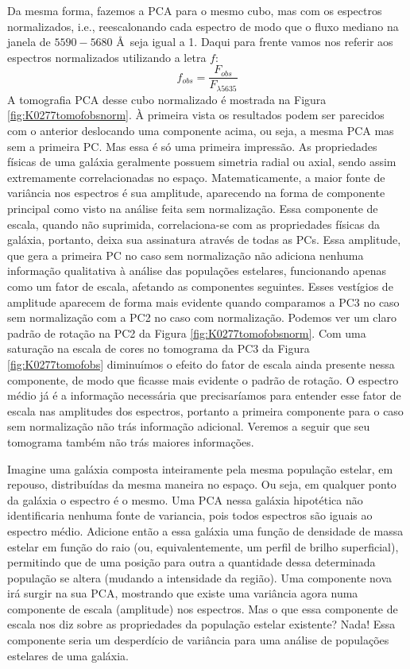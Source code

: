 Da mesma forma, fazemos a PCA para o mesmo cubo, mas com os espectros normalizados, i.e., reescalonando cada espectro de
modo que o fluxo mediano na janela de $5590-5680$ \AA\ seja igual a 1. Daqui para frente vamos nos referir aos espectros
normalizados utilizando a letra $f$:
\begin{equation}
f_{obs} = \dfrac{F_{obs}}{F_{\lambda5635}}
\end{equation} 
\noindent A tomografia PCA desse cubo normalizado é mostrada na Figura \ref{fig:K0277tomofobsnorm}. À primeira vista os
resultados podem ser parecidos com o anterior deslocando uma componente acima, ou seja, a mesma PCA mas sem a primeira
PC. Mas essa é só uma primeira impressão. As propriedades físicas de uma galáxia geralmente possuem simetria radial ou
axial, sendo assim extremamente correlacionadas no espaço. Matematicamente, a maior fonte de variância nos espectros é
sua amplitude, aparecendo na forma de componente principal como visto na análise feita sem normalização. Essa componente
de escala, quando não suprimida, correlaciona-se com as propriedades físicas da galáxia, portanto, deixa sua assinatura
através de todas as PCs. Essa amplitude, que gera a primeira PC no caso sem normalização não adiciona nenhuma informação
qualitativa à análise das populações estelares, funcionando apenas como um fator de escala, afetando as componentes
seguintes. Esses vestígios de amplitude aparecem de forma mais evidente quando comparamos a PC3 no caso sem normalização
com a PC2 no caso com normalização. Podemos ver um claro padrão de rotação na PC2 da Figura \ref{fig:K0277tomofobsnorm}.
Com uma saturação na escala de cores no tomograma da PC3 da Figura \ref{fig:K0277tomofobs} diminuímos o efeito do fator
de escala ainda presente nessa componente, de modo que ficasse mais evidente o padrão de rotação. O espectro médio já é
a informação necessária que precisaríamos para entender esse fator de escala nas amplitudes dos espectros, portanto a
primeira componente para o caso sem normalização não trás informação adicional. Veremos a seguir que seu tomograma
também não trás maiores informações.

Imagine uma galáxia composta inteiramente pela mesma população estelar, em repouso, distribuídas da mesma maneira no
espaço. Ou seja, em qualquer ponto da galáxia o espectro é o mesmo. Uma PCA nessa galáxia hipotética não identificaria
nenhuma fonte de variancia, pois todos espectros são iguais ao espectro médio. Adicione então a essa galáxia uma função
de densidade de massa estelar em função do raio (ou, equivalentemente, um perfil de brilho superficial), permitindo que
de uma posição para outra a quantidade dessa determinada população se altera (mudando a intensidade da região). Uma
componente nova irá surgir na sua PCA, mostrando que existe uma variância agora numa componente de escala (amplitude)
nos espectros. Mas o que essa componente de escala nos diz sobre as propriedades da população estelar existente? Nada!
Essa componente seria um desperdício de variância para uma análise de populações estelares de uma galáxia.

